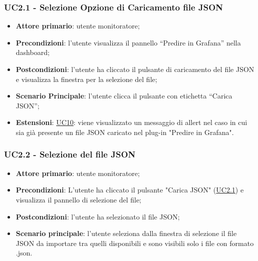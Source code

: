 		\label{par:UC2.1}
		\subsubsection{UC2.1 - Selezione Opzione di Caricamento file JSON}
		\begin{itemize}
			\item\textbf{Attore primario}: utente monitoratore;
			\item\textbf{Precondizioni}: l’utente visualizza il pannello “Predire in Grafana” nella dashboard;
			\item\textbf{Postcondizioni}: l’utente ha cliccato il pulsante di caricamento del file JSON e visualizza la finestra per la selezione del file;
			\item\textbf{Scenario Principale}: l’utente clicca il pulsante con etichetta  “Carica JSON”;
			\item\textbf{Estensioni}: \hyperref[par:UC10]{UC10}: viene visualizzato un messaggio di allert nel caso in cui sia già presente un file JSON caricato nel plug-in "Predire in Grafana".
		\end{itemize}		
		
		\label{par:UC2.2}
		\subsubsection{UC2.2 - Selezione del file JSON}
		\begin{itemize}
			\item\textbf{Attore primario}: utente monitoratore;
			\item\textbf{Precondizioni}: L’utente ha cliccato il pulsante "Carica JSON" (\hyperref[par:UC2.1]{UC2.1}) e visualizza il pannello di selezione del file;
			\item\textbf{Postcondizioni}: l’utente ha selezionato il file JSON;
			\item\textbf{Scenario principale}: l’utente seleziona dalla finestra di selezione il file JSON da importare tra quelli disponibili e sono visibili solo i file con formato .json.
		\end{itemize}
		
		\label{par:UC2.3}

